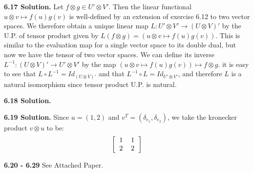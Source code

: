 \textbf{6.17 Solution.} Let $f \otimes g \in U' \otimes V'$. Then the linear functional $u \otimes v \mapsto f(u)g(v)$ is well-defined by an extension of exercise 6.12 to two vector spaces. We therefore obtain a unique linear map $L: U' \otimes V' \to (U \otimes V)'$ by the U.P. of tensor product given by $L(f \otimes g) = (u \otimes v \mapsto f(u)g(v))$. This is similar to the evaluation map for a single vector space to its double dual, but now we have the tensor of two vector spaces. We can define its inverse $L^{-1}: (U \otimes V)' \to U' \otimes V'$ by the map $(u \otimes v \mapsto f(u)g(v)) \mapsto f \otimes g$. it is easy to see that $L \circ L^{-1} = Id_{(U \otimes V)'}$ and that $L^{-1} \circ L = Id_{U' \otimes V'}$, and therefore $L$ is a natural isomorphism since tensor product U.P. is natural.

\textbf{6.18 Solution.}


\textbf{6.19 Solution.} Since $u = (1, 2)$ and $v^{T} = (\delta_{e_1}, \delta_{e_2})$, we take the kronecker product $v \otimes u$ to be:
\[\left[\begin{tabular}{cc}
1 & 1 \\
2 & 2
\end{tabular}\right]\]

\textbf{6.20 - 6.29} See Attached Paper.